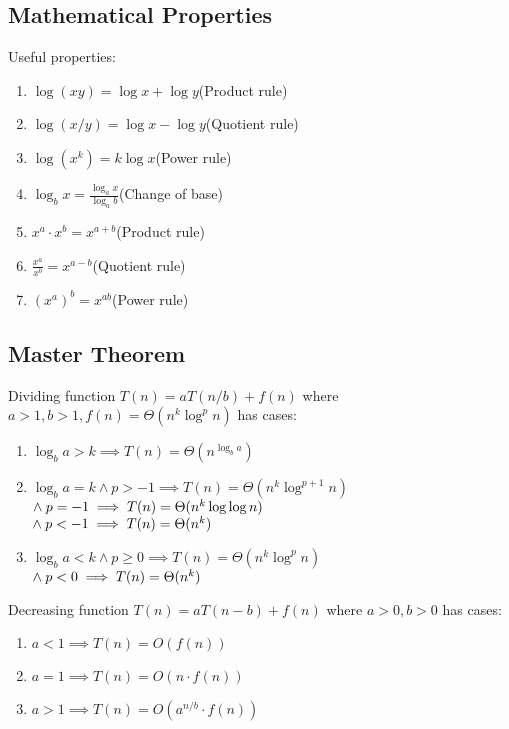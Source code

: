 \documentclass[12pt, a4paper]{article}
\begin{document}
\begin{multicols*}{3}
\subsection{Mathematical Properties}
Useful properties:
\begin{enumerate}[\roman*.]
  \item $\log(xy) = \log x + \log y$\hfill(Product rule) 
  \item $\log(x/y) = \log x - \log y$\hfill(Quotient rule)
  \item $\log(x^k) = k\log x$\hfill(Power rule)
  \item $\log_bx = \frac{\log_ax}{\log_ab}$\hfill(Change of base)
  \item $x^a \cdot x^b = x^{a+b}$\hfill(Product rule) 
  \item $\frac{x^a}{x^b} = x^{a-b}$\hfill(Quotient rule)
  \item $(x^a)^b = x^{ab}$\hfill(Power rule)
\end{enumerate}
\colbreak

\subsection{Master Theorem}

Dividing function $T(n) = aT(n/b) + f(n)$ where $a>1, b>1, f(n) = \Theta(n^k\log^pn)$ has cases:
\begin{enumerate}[\roman*.]
  \item $\log_ba > k \implies T(n)=\Theta(n^{\log_ba})$
  \item $\log_ba = k \land p>-1 \implies T(n) = \Theta(n^k\log^{p+1}n)$\\
    \hspace{4.5em}$\land\hspace{0.25em}p=-1 \implies T(n) = \Theta(n^k\log\log n)$\\
    \hspace{4.5em}$\land\hspace{0.25em}p<-1 \implies T(n) = \Theta(n^k)$
  \item $\log_ba < k \land p \geq 0 \implies T(n) = \Theta(n^k\log^pn)$\\
    \hspace{4.5em}$\land\hspace{0.25em}p<0 \implies T(n) = \Theta(n^k)$
\end{enumerate}

Decreasing function $T(n) = aT(n-b) + f(n)$ where $a>0, b>0$ has cases:
\begin{enumerate}[\roman*.]
  \item $a < 1 \implies T(n)=O(f(n))$
  \item $a = 1 \implies T(n) = O(n\cdot f(n))$
  \item $a > 1 \implies T(n) = O(a^{n/b}\cdot f(n))$
\end{enumerate}


\end{multicols*}
\end{document}
